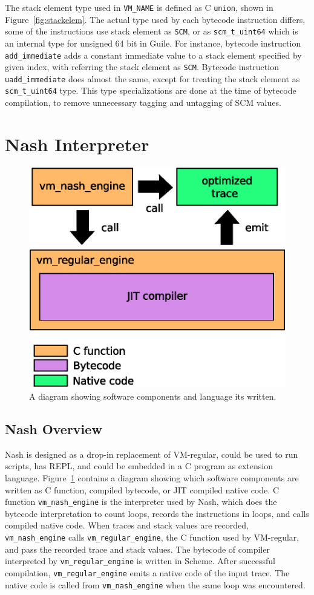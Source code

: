 \documentclass[preprint, 10pt]{sigplanconf}
\begin{document}
The stack element type used in \texttt{VM\_NAME} is defined as C \texttt{union},
shown in Figure~\hyperref[fig:stackelem]{\ref{fig:stackelem}}.  The actual type
used by each bytecode instruction differs, some of the instructions use stack
element as \texttt{SCM}, or as \texttt{scm\_t\_uint64} which is an internal type
for unsigned 64 bit in Guile. For instance, bytecode instruction
\texttt{add\_immediate} adds a constant immediate value to a stack element
specified by given index, with referring the stack element as
\texttt{SCM}. Bytecode instruction \texttt{uadd\_immediate} does almost the
same, except for treating the stack element as \texttt{scm\_t\_uint64}
type. This type specializations are done at the time of bytecode compilation, to
remove unnecessary tagging and untagging of SCM values.

\section{Nash Interpreter}
\label{sec:interpreter}

\begin{figure}
  \centering
  \includegraphics[width=0.4 \textwidth]{overview}
  \caption{A diagram showing software components and language its written.}
\label{fig:overview}
\end{figure}

\subsection{Nash Overview}


Nash is designed as a drop-in replacement of VM-regular, could be used to run
scripts, has REPL, and could be embedded in a C program as extension
language. Figure~\hyperref[fig:overview]{\ref{fig:overview}} contains a diagram
showing which software components are written as C function, compiled bytecode,
or JIT compiled native code. C function \texttt{vm\_nash\_engine} is the
interpreter used by Nash, which does the bytecode interpretation to count loops,
records the instructions in loops, and calls compiled native code. When traces
and stack values are recorded, \texttt{vm\_nash\_engine} calls
\texttt{vm\_regular\_engine}, the C function used by VM-regular, and pass the
recorded trace and stack values. The bytecode of compiler interpreted by
\texttt{vm\_regular\_engine} is written in Scheme. After successful compilation,
\texttt{vm\_regular\_engine} emits a native code of the input trace. The native
code is called from \texttt{vm\_nash\_engine} when the same loop was
encountered.
\end{document}
